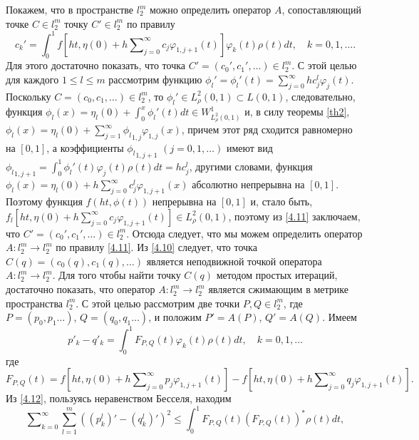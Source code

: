 Покажем, что в пространстве $l_2^m$ можно определить   оператор $A$, сопоставляющий точке $C\in l_2^m$ точку $C'\in l_2^m$ по правилу
\begin{equation}\label{4.11}
c_k'=\int_{0}^1f\left[ht,\eta(0)+ h\sum\nolimits_{j=0}^\infty c_j
\varphi_{1,j+1}(t)\right]\varphi_k(t)\rho(t) dt,\quad k=0,1,\ldots.
\end{equation}
Для этого достаточно показать, что точка $C'=(c_0',c_1',\ldots)\in l_2^m$. С этой целью для каждого $1\le l\le m$ рассмотрим функцию
$\phi_l'=\phi_l'(t)= \sum\nolimits_{j=0}^\infty hc_j^l\varphi_j(t)$. Поскольку $C=(c_0,c_1,\ldots)\in l_2^m$, то $\phi_l'\in L^2_\rho(0,1)\subset L(0,1)$, следовательно, функция $\phi_l(x)=\eta_l(0)+\int_0^x\phi_l'(t)dt\in W^1_{L^2_\rho(0,1)}$ и, в силу теоремы \ref{th2},  $\phi_l(x)=\eta_l(0)+\sum_{j=1}^\infty{\phi_l}_{1,j}\varphi_{1,j}(x)$, причем этот ряд сходится равномерно на $[0,1]$, а  коэффициенты ${\phi_l}_{1,j+1}$ $(j=0,1,\ldots)$ имеют вид
${\phi_l}_{1,j+1}=\int_0^1\phi_l'(t)\varphi_{j}(t)\rho(t)dt=hc_j^l$, другими словами, функция
$\phi_l(x)=\eta_l(0)+h\sum_{j=0}^\infty c_j^l\varphi_{1,j+1}(x)$ абсолютно непрерывна на $[0,1]$. Поэтому функция $f(ht,\phi(t))$ непрерывна на $[0,1]$ и, стало быть,
$f_l\left[ht,\eta(0)+ h\sum\nolimits_{j=0}^\infty c_j
\varphi_{1,j+1}(t)\right]\in L^2_\rho(0,1)$, поэтому\underline{} из \eqref{4.11} заключаем, что $C'=(c_0',c_1',\ldots)\in l_2^m$. Отсюда следует, что мы можем определить  оператор $A:l_2^m\to l_2^m$ по правилу \eqref{4.11}.
Из  \eqref{4.10} следует, что точка $C(q)=(c_0(q),c_1(q),\ldots)$ является неподвижной точкой оператора $A:l_2^m\to l_2^m$. Для того чтобы найти точку $C(q)$ методом простых итераций, достаточно показать, что оператор $A:l_2^m\to l_2^m$ является сжимающим в метрике пространства $l_2^m$. С этой целью рассмотрим две точки $P,Q\in l_2^m$, где $P=(p_0,p_1\ldots)$, $Q=(q_0,q_1\ldots)$, и положим $P'=A(P)$, $Q'=A(Q)$. Имеем
\begin{equation}\label{4.12}
p'_k-q'_k=\int_{0}^1F_{P,Q}(t)\varphi_k(t)\rho(t)dt,\quad k=0,1,\ldots
\end{equation}
где
\begin{equation}\label{4.13}
F_{P,Q}(t)=f\left[ht,\eta(0)+ h\sum\nolimits_{j=0}^\infty p_j\varphi_{1,j+1}(t)\right] 
-f\left[ht,\eta(0)+ h\sum\nolimits_{j=0}^\infty q_j\varphi_{1,j+1}(t)\right].
\end{equation}
Из \eqref{4.12}, пользуясь неравенством Бесселя, находим
\begin{equation}\label{4.14}
\sum\nolimits_{k=0}^\infty \sum_{l=1}^m((p^l_k)'-(q^l_k)')^2\le\int_{0}^1F_{P,Q}(t)(F_{P,Q}(t))^*\rho(t) dt,
\end{equation}
